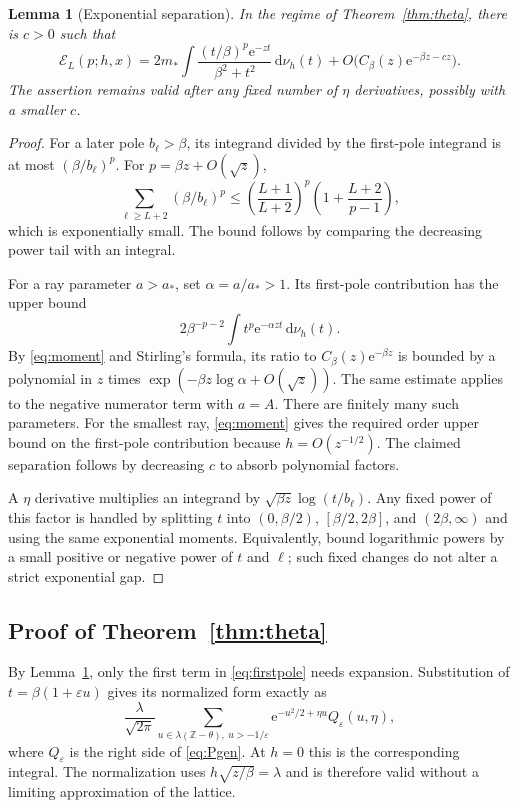 \documentclass[11pt,a4paper]{article}
\numberwithin{equation}{section}
\newtheorem{lemma}[theorem]{Lemma}
\theoremstyle{definition}\newtheorem{definition}[theorem]{Definition}
\theoremstyle{remark}\newtheorem{remark}[theorem]{Remark}
\newcommand{\e}{\mathrm e}
\newcommand{\dd}{\,\mathrm d}
\newcommand{\Z}{\mathbb Z}
\newcommand{\astar}{a_*}
\newcommand{\mstar}{m_*}
\newcommand{\eps}{\varepsilon}
\newcommand{\calE}{\mathcal E}
\begin{document}
\begin{lemma}[Exponential separation]
\label{lem:separation}
In the regime of Theorem~\ref{thm:theta}, there is $c>0$ such that
\begin{equation}
 \calE_L(p;h,x)=
 2\mstar\int\frac{(t/\beta)^p\e^{-zt}}{\beta^2+t^2}\dd\nu_h(t)
 +O\bigl(C_\beta(z)\e^{-\beta z-cz}\bigr).
 \label{eq:firstpole}
\end{equation}
The assertion remains valid after any fixed number of $\eta$ derivatives,
possibly with a smaller $c$.
\end{lemma}
\begin{proof}
For a later pole $b_\ell>\beta$, its integrand divided by the first-pole
integrand is at most $(\beta/b_\ell)^p$. For $p=\beta z+O(\sqrt z)$,
\[
 \sum_{\ell\ge L+2}(\beta/b_\ell)^p
 \le\left(\frac{L+1}{L+2}\right)^p
        \left(1+\frac{L+2}{p-1}\right),
\]
which is exponentially small. The bound follows by comparing the decreasing
power tail with an integral.

For a ray parameter $a>\astar$, set $\alpha=a/\astar>1$. Its first-pole
contribution has the upper bound
\[
 2\beta^{-p-2}\int t^p\e^{-\alpha zt}\dd\nu_h(t).
\]
By \eqref{eq:moment} and Stirling's formula, its ratio to
$C_\beta(z)\e^{-\beta z}$ is bounded by a polynomial in $z$ times
$\exp(-\beta z\log\alpha+O(\sqrt z))$. The same estimate applies to the
negative numerator term with $a=A$. There are finitely many such parameters.
For the smallest ray, \eqref{eq:moment} gives the required order upper bound
on the first-pole contribution because $h=O(z^{-1/2})$. The claimed separation
follows by decreasing $c$ to absorb polynomial factors.

A $\eta$ derivative multiplies an integrand by
$\sqrt{\beta z}\log(t/b_\ell)$. Any fixed power of this factor is handled by
splitting $t$ into $(0,\beta/2)$, $[\beta/2,2\beta]$, and $(2\beta,\infty)$
and using the same exponential moments. Equivalently, bound logarithmic
powers by a small positive or negative power of $t$ and $\ell$; such fixed
changes do not alter a strict exponential gap.
\end{proof}

\subsection{Proof of Theorem~\ref{thm:theta}}
By Lemma~\ref{lem:separation}, only the first term in \eqref{eq:firstpole}
needs expansion. Substitution of $t=\beta(1+\eps u)$ gives its normalized
form exactly as
\begin{equation}
 \frac\lambda{\sqrt{2\pi}}
 \sum_{u\in\lambda(\Z-\theta),\ u>-1/\eps}
 \e^{-u^2/2+\eta u}Q_\eps(u,\eta),
 \label{eq:exact-scaled}
\end{equation}
where $Q_\eps$ is the right side of \eqref{eq:Pgen}. At $h=0$ this is the
corresponding integral. The normalization uses
$h\sqrt{z/\beta}=\lambda$ and is therefore valid without a limiting
approximation of the lattice.
\end{document}
